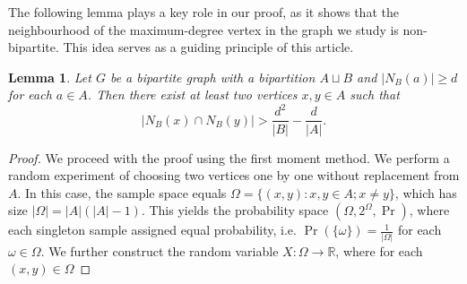 \documentclass[reqno,10pt]{amsart}
\newtheorem{lemma}[theorem]{Lemma}
\theoremstyle{definition}
\begin{document}
The following lemma plays a key role in our proof, as it shows that the neighbourhood of the maximum-degree vertex in the graph we study is non-bipartite. This idea serves as a guiding principle of this article. 
\begin{lemma}\label{intersection lemma}
Let $G$ be a bipartite graph with a bipartition $A\sqcup B$ and $|N_{B}(a)|\geq d$ for each $a\in A$. Then there exist at least two vertices $x,y\in A$ such that 
\begin{equation*}
 |N_{B}(x)\cap N_{B}(y)|> \frac{d^{2}}{|B|}-\frac{d}{|A|}.   
\end{equation*}
\end{lemma}
\begin{proof}
We proceed with the proof using the first moment method. We perform a random experiment of choosing two vertices one by one without replacement from $A$. In this case, the sample space equals $\Omega=\{(x,y): x,y\in A; x\neq y\}$, which has size $|\Omega|=|A|(|A|-1)$. This yields the probability space $(\Omega, 2^{\Omega},\Pr)$,  where each singleton sample assigned equal probability, i.e. $\Pr(\{\omega\})=\frac{1}{|\Omega|}$ for each $\omega\in\Omega$. We further construct the random variable $X:\Omega\rightarrow \mathbb{R}$, where for each $(x,y)\in\Omega$


\end{proof}
\end{document}
